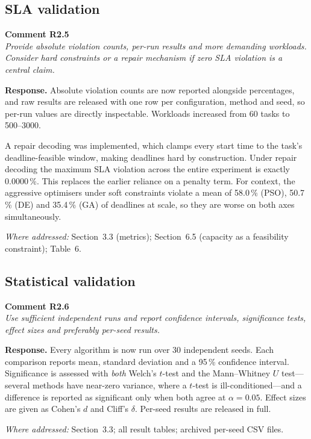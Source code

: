 \documentclass[11pt,a4paper]{article}
\newcommand{\rsp}[1]{\vspace{2pt}\noindent\textbf{Response.} #1\par\vspace{6pt}}
\newcommand{\rwhere}[1]{\noindent\textit{Where addressed:} #1\par\vspace{10pt}}
\newenvironment{revcomment}[1]
  {\begin{tcolorbox}[colback=gray!6,colframe=gray!45,boxrule=0.4pt,
     left=6pt,right=6pt,top=4pt,bottom=4pt]\textbf{#1}\\[2pt]\itshape\color{cmt}}
  {\end{tcolorbox}\vspace{4pt}}
\begin{document}
\subsection*{SLA validation}
\begin{revcomment}{Comment R2.5}
Provide absolute violation counts, per-run results and more demanding workloads.
Consider hard constraints or a repair mechanism if zero SLA violation is a central
claim.
\end{revcomment}
\rsp{Absolute violation counts are now reported alongside percentages, and raw
results are released with one row per configuration, method and seed, so per-run
values are directly inspectable. Workloads increased from 60 tasks to 500--3000.

A repair decoding was implemented, which clamps every start time to the task's
deadline-feasible window, making deadlines hard by construction. Under repair
decoding the maximum SLA violation across the entire experiment is exactly
0.0000\,\%. This replaces the earlier reliance on a penalty term. For context, the
aggressive optimisers under soft constraints violate a mean of 58.0\,\% (PSO),
50.7\,\% (DE) and 35.4\,\% (GA) of deadlines at scale, so they are worse on both
axes simultaneously.}
\rwhere{Section~3.3 (metrics); Section~6.5 (capacity as a feasibility constraint); Table~6.}

\subsection*{Statistical validation}
\begin{revcomment}{Comment R2.6}
Use sufficient independent runs and report confidence intervals, significance
tests, effect sizes and preferably per-seed results.
\end{revcomment}
\rsp{Every algorithm is now run over 30 independent seeds. Each comparison reports
mean, standard deviation and a 95\,\% confidence interval. Significance is assessed
with \emph{both} Welch's $t$-test and the Mann--Whitney $U$ test---several methods
have near-zero variance, where a $t$-test is ill-conditioned---and a difference is
reported as significant only when both agree at $\alpha = 0.05$. Effect sizes are
given as Cohen's $d$ and Cliff's $\delta$. Per-seed results are released in full.}
\rwhere{Section~3.3; all result tables; archived per-seed CSV files.}
\end{document}
